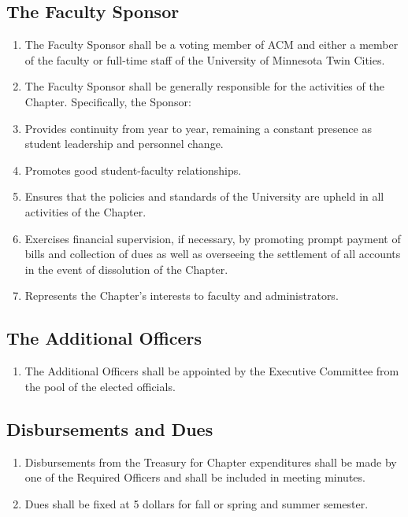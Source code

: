 \documentclass[12pt,letterpaper]{article}
\begin{document}
\subsection{The Faculty Sponsor}
\begin{enumerate}
	\item The Faculty Sponsor shall be a voting member of ACM and either a member of
	      the faculty or full-time staff of the University of Minnesota Twin Cities.
	\item The Faculty Sponsor shall be generally responsible for the activities of the
				Chapter. Specifically, the Sponsor:
	\item Provides continuity from year to year, remaining a constant presence as
				student leadership and personnel change.
	\item Promotes good student-faculty relationships.
	\item Ensures that the policies and standards of the University are upheld in all
				activities of the Chapter.
	\item Exercises financial supervision, if necessary, by promoting prompt payment of
				bills and collection of dues as well as overseeing the settlement of all
				accounts in the event of dissolution of the Chapter.
	\item Represents the Chapter's interests to faculty and administrators.
\end{enumerate}

\subsection{The Additional Officers}
\begin{enumerate}
	\item The Additional Officers shall be appointed by the Executive Committee from
				the pool of the elected officials. 
\end{enumerate}

\subsection{Disbursements and Dues}
\begin{enumerate}
	\item Disbursements from the Treasury for Chapter expenditures shall be made by one
				of the Required Officers and shall be included in meeting minutes.
	\item Dues shall be fixed at 5 dollars for fall or spring and summer semester.
\end{enumerate}
\end{document}
